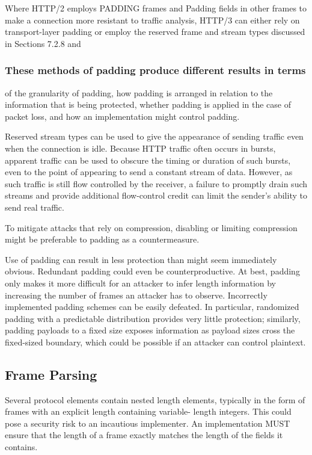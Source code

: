 \documentclass{article}
\begin{document}
Where HTTP/2 employs PADDING frames and Padding fields in other frames to make a connection more resistant to traffic analysis, HTTP/3 can either rely on transport-layer padding or employ the reserved frame and stream types discussed in Sections 7.2.8 and

\subsubsection{These methods of padding produce different results in terms}

of the granularity of padding, how padding is arranged in relation to the information that is being protected, whether padding is applied in the case of packet loss, and how an implementation might control padding.

Reserved stream types can be used to give the appearance of sending traffic even when the connection is idle.  Because HTTP traffic often occurs in bursts, apparent traffic can be used to obscure the timing or duration of such bursts, even to the point of appearing to send a constant stream of data.  However, as such traffic is still flow controlled by the receiver, a failure to promptly drain such streams and provide additional flow-control credit can limit the sender's ability to send real traffic.

To mitigate attacks that rely on compression, disabling or limiting compression might be preferable to padding as a countermeasure.

Use of padding can result in less protection than might seem immediately obvious.  Redundant padding could even be counterproductive.  At best, padding only makes it more difficult for an attacker to infer length information by increasing the number of frames an attacker has to observe.  Incorrectly implemented padding schemes can be easily defeated.  In particular, randomized padding with a predictable distribution provides very little protection; similarly, padding payloads to a fixed size exposes information as payload sizes cross the fixed-sized boundary, which could be possible if an attacker can control plaintext.

\subsection{Frame Parsing}

Several protocol elements contain nested length elements, typically in the form of frames with an explicit length containing variable- length integers.  This could pose a security risk to an incautious implementer.  An implementation MUST ensure that the length of a frame exactly matches the length of the fields it contains.
\end{document}
